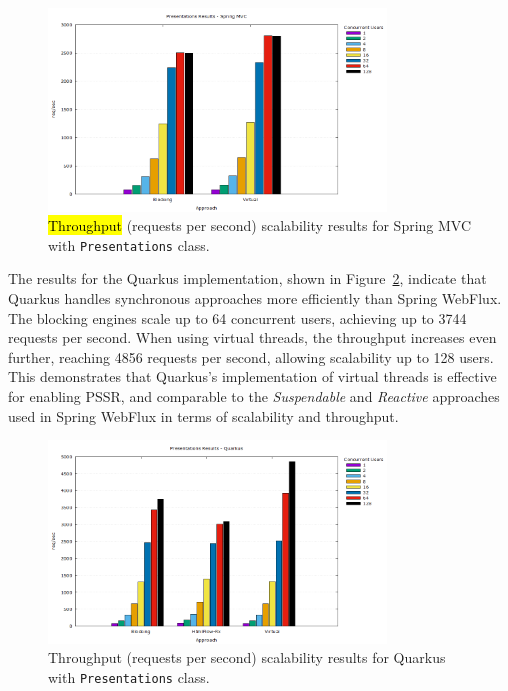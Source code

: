 \documentclass[software,article,accept,pdftex,moreauthors]{Definitions/mdpi}
\begin{document}
\begin{figure}[H]
\vspace{-6pt}
     \includegraphics[width=0.8\textwidth]{./Graphs/presentations-springmvc-jmeter.png}
     \caption{\hl{Throughput} %
 (requests per second) scalability results for Spring MVC with \texttt{Presentations} class.}\label{fig:presentations-springmvc-jmeter}
\end{figure}



The results for the Quarkus implementation, shown in
Figure~\ref{fig:presentations-quarkus-jmeter}, indicate that Quarkus handles
synchronous approaches more efficiently than Spring WebFlux. The blocking
engines scale up to 64 concurrent users, achieving up to 3744 requests per
second. When using virtual threads, the throughput increases even further,
reaching 4856 requests per second, allowing scalability up to 128 users. This
demonstrates that Quarkus's implementation of virtual threads is effective for
enabling PSSR\@, and comparable to the \textit{Suspendable} and
\textit{Reactive} approaches used in Spring WebFlux in terms of scalability and
throughput.

\vspace{-3pt}
\begin{figure}[H]
     \includegraphics[width=0.8\textwidth]{./Graphs/presentations-quarkus-jmeter.png}
     \caption{Throughput %
 (requests per second) scalability results for Quarkus with \texttt{Presentations} class.}\label{fig:presentations-quarkus-jmeter}
\end{figure}
\end{document}
